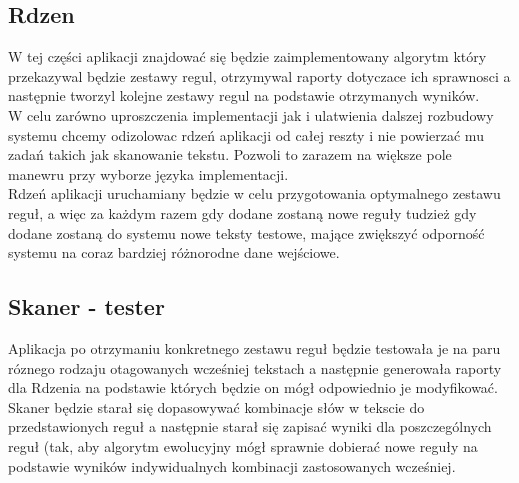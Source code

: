 \documentclass[12pt]{article}
\begin{document}
\subsection{Rdzen}
W tej części aplikacji znajdować się będzie zaimplementowany algorytm który przekazywal będzie zestawy regul, otrzymywal raporty dotyczace ich sprawnosci a następnie tworzyl kolejne zestawy regul na podstawie otrzymanych wyników. 
\\W celu zarówno uproszczenia implementacji jak i ulatwienia dalszej rozbudowy systemu chcemy odizolowac rdzeń aplikacji od całej reszty i nie powierzać mu zadań takich jak skanowanie tekstu. Pozwoli to zarazem na większe pole manewru przy wyborze języka implementacji.
\\Rdzeń aplikacji uruchamiany będzie w celu przygotowania optymalnego zestawu reguł, a więc za każdym razem gdy dodane zostaną nowe reguły tudzież gdy dodane zostaną do systemu nowe teksty testowe, mające zwiększyć odporność systemu na coraz bardziej różnorodne dane wejściowe.
\subsection{Skaner - tester}
Aplikacja po otrzymaniu konkretnego zestawu reguł będzie testowała je na paru róznego rodzaju otagowanych wcześniej tekstach a następnie generowała raporty dla Rdzenia na podstawie których będzie on mógł odpowiednio je modyfikować.
\\Skaner będzie starał się dopasowywać kombinacje słów w tekscie do przedstawionych reguł a następnie starał się zapisać wyniki dla poszczególnych reguł (tak, aby algorytm ewolucyjny mógł sprawnie dobierać nowe reguły na podstawie wyników indywidualnych kombinacji zastosowanych wcześniej.
\end{document}
